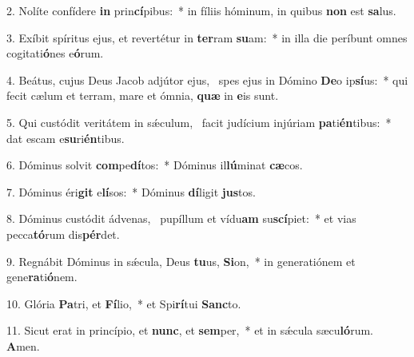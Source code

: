 2. Nolíte confídere \textbf{in} prin\textbf{cí}pibus:~*  in fíliis hóminum, in quibus \textbf{non} est \textbf{sa}lus.\

3. Exíbit spíritus ejus, et revertétur in \textbf{ter}ram \textbf{su}am:~*  in illa die períbunt omnes cogitati\textbf{ó}nes e\textbf{ó}rum.\

4. Beátus, cujus Deus Jacob adjútor ejus, \dag\  spes ejus in Dómino \textbf{De}o ip\textbf{sí}us:~*  qui fecit cælum et terram, mare et ómnia, \textbf{quæ} in \textbf{e}is sunt.\

5. Qui custódit veritátem in sǽculum, \dag\  facit judícium injúriam \textbf{pa}ti\textbf{én}tibus:~*  dat escam e\textbf{su}ri\textbf{én}tibus.\

6. Dóminus solvit \textbf{com}pe\textbf{dí}tos:~*  Dóminus il\textbf{lú}minat \textbf{cæ}cos.\

7. Dóminus éri\textbf{git} e\textbf{lí}sos:~*  Dóminus \textbf{dí}ligit \textbf{jus}tos.\

8. Dóminus custódit ádvenas, \dag\  pupíllum et vídu\textbf{am} su\textbf{scí}piet:~*  et vias pecca\textbf{tó}rum dis\textbf{pér}det.\

9. Regnábit Dóminus in sǽcula, Deus \textbf{tu}us, \textbf{Si}on,~*  in generatiónem et gene\textbf{ra}ti\textbf{ó}nem.\

10. Glória \textbf{Pa}tri, et \textbf{Fí}lio,~*  et Spi\textbf{rí}tui \textbf{Sanc}to.\

11. Sicut erat in princípio, et \textbf{nunc}, et \textbf{sem}per,~*  et in sǽcula sæcu\textbf{ló}rum. \textbf{A}men.\

